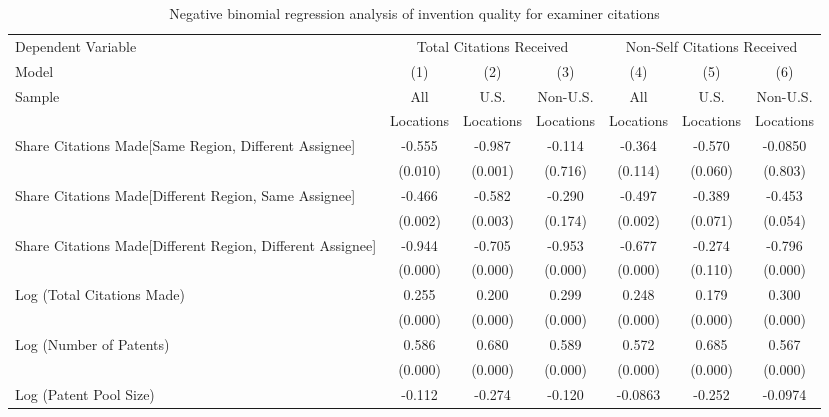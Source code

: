 \begin{sidewaystable}[htbp]\centering
\caption{Negative binomial regression analysis of invention quality for examiner citations \label{e.model123192021}}
\small
\onehalfspacing
\begin{tabular}{l*{6}{c}}
\hline\hline

 Dependent Variable&\multicolumn{3}{c}{Total Citations Received}&\multicolumn{3}{c}{Non-Self Citations Received}\\
                Model&\multicolumn{1}{c}{(1)}&\multicolumn{1}{c}{(2)}&\multicolumn{1}{c}{(3)}&\multicolumn{1}{c}{(4)}&\multicolumn{1}{c}{(5)}&\multicolumn{1}{c}{(6)}\\
                 \hline
 \multirow{2}{*}{Sample}&\multicolumn{1}{c}{All}&\multicolumn{1}{c}{U.S.}&\multicolumn{1}{c}{Non-U.S.}&\multicolumn{1}{c}{All}&\multicolumn{1}{c}{U.S.}&\multicolumn{1}{c}{Non-U.S.}\\       
  &\multicolumn{1}{c}{Locations}&\multicolumn{1}{c}{Locations}&\multicolumn{1}{c}{Locations}&\multicolumn{1}{c}{Locations}&\multicolumn{1}{c}{Locations}&\multicolumn{1}{c}{Locations}\\    \hline
Share Citations Made[Same Region, Different Assignee]&   -0.555&   -0.987&   -0.114&   -0.364&   -0.570&  -0.0850\\
                &  (0.010)&  (0.001)&  (0.716)&  (0.114)&  (0.060)&  (0.803)\\
Share Citations Made[Different Region, Same Assignee]&   -0.466&   -0.582&   -0.290&   -0.497&   -0.389&   -0.453\\
                &  (0.002)&  (0.003)&  (0.174)&  (0.002)&  (0.071)&  (0.054)\\
Share Citations Made[Different Region, Different Assignee]&   -0.944&   -0.705&   -0.953&   -0.677&   -0.274&   -0.796\\
                &  (0.000)&  (0.000)&  (0.000)&  (0.000)&  (0.110)&  (0.000)\\
Log (Total Citations Made)&    0.255&    0.200&    0.299&    0.248&    0.179&    0.300\\
                &  (0.000)&  (0.000)&  (0.000)&  (0.000)&  (0.000)&  (0.000)\\
Log (Number of Patents)&    0.586&    0.680&    0.589&    0.572&    0.685&    0.567\\
                &  (0.000)&  (0.000)&  (0.000)&  (0.000)&  (0.000)&  (0.000)\\
Log (Patent Pool Size)&   -0.112&   -0.274&   -0.120&  -0.0863&   -0.252&  -0.0974\\

\end{tabular}
\end{sidewaystable}
